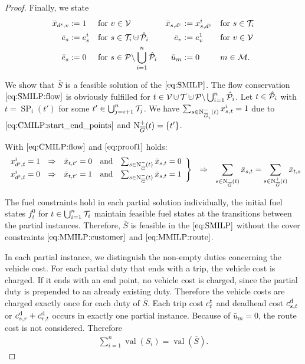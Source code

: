 \begin{proof}
Finally, we state
\begin{align*}
	\bar{x}_{\ds,v} & := 1 && \text{for } v\in\mathcal{V} & \bar{x}_{s,\de} & := x^i_{s,\de} && \text{for } s\in\Ti \\
	\bar{e}_s & := e^i_s && \text{for } s\in\Ti\cupdot\Phat_i & \bar{e}_v & := e^1_v && \text{for } v\in\mathcal{V} \\
	\bar{e}_s & := 0 && \text{for } s\in\mathcal{P}\backslash\Cupdot_{i=1}^n \Phat_i & \bar{u}_m & := 0 && m\in\mathcal{M}.
\end{align*}

We show that $\overline{S}$ is a feasible solution of the $\eqref{eq:SMILP}$. The flow conservation $\eqref{eq:SMILP:flow}$ is obviously fulfilled for ${t\in\mathcal{V}\cupdot\mathcal{T}\cupdot\mathcal{P}\backslash\Cupdot_{i=1}^n \Phat_i}$. Let ${t\in\hat{\mathcal{P}}_i}$ with ${t=\operatorname{SP}_i\left(t'\right)}$ for some ${t'\in\bigcup_{j=i+1}^n \mathcal{T}_j}$. We have ${\sum_{s\in\operatorname{N}_{\overline{G}_i}^-(t)} x^i_{s,t} = 1}$ due to $\eqref{eq:CMILP:start_end_points}$ and $\operatorname{N}_{\overline{G}}^+(t) = \left\{t'\right\}$.

With $\eqref{eq:CMILP:flow}$ and $\eqref{eq:proof1}$ holds:
\begin{align*}
	\left.\begin{array}{ccccc}
		x^i_{d^{\operatorname{s}},t} = 1 & \Rightarrow & \bar{x}_{t,t'} = 0 & \text{and} & \sum_{s\in\operatorname{N}_{\overline{G}}^-(t)}\bar{x}_{s,t} = 0 \\
		x^i_{d^{\operatorname{s}},t} = 0 & \Rightarrow & \bar{x}_{t,t'} = 1 & \text{and} & \sum_{s\in\operatorname{N}_{\overline{G}}^-(t)}\bar{x}_{s,t} = 1
	\end{array}\right\} && \Rightarrow && \sum_{s\in\operatorname{N}_{\overline{G}}^-(t)}\bar{x}_{s,t} = \sum_{s\in\operatorname{N}_{\overline{G}}^+(t)}\bar{x}_{t,s}
\end{align*}

The fuel constraints hold in each partial solution individually, the initial fuel states $f^0_t$ for ${t\in\bigcup_{i=1}^n \mathcal{T}_i}$ maintain feasible fuel states at the transitions between the partial instances. Therefore, $\overline{S}$ is feasible in the $\eqref{eq:SMILP}$ without the cover constraints $\eqref{eq:MMILP:customer}$ and $\eqref{eq:MMILP:route}$.

In each partial instance, we distinguish the non-empty duties concerning the vehicle cost. For each partial duty that ends with a trip, the vehicle cost is charged. If it ends with an end point, no vehicle cost is charged, since the partial duty is prepended to an already existing duty. Therefore the vehicle costs are charged exactly once for each duty of $\overline{S}$. Each trip cost $c^{\operatorname{t}}_t$ and deadhead cost $c^{\operatorname{d}}_{s,t}$ or ${c^{\operatorname{d}}_{s,r}+c^{\operatorname{d}}_{r,t}}$ occurs in exactly one partial instance. Because of ${\bar{u}_m=0}$, the route cost is not considered. Therefore
\begin{align*}
	\sum_{i=1}^n\operatorname{val}\left(S_i\right) = \operatorname{val}\left(\overline{S}\right).
\end{align*}
%
\end{proof}

